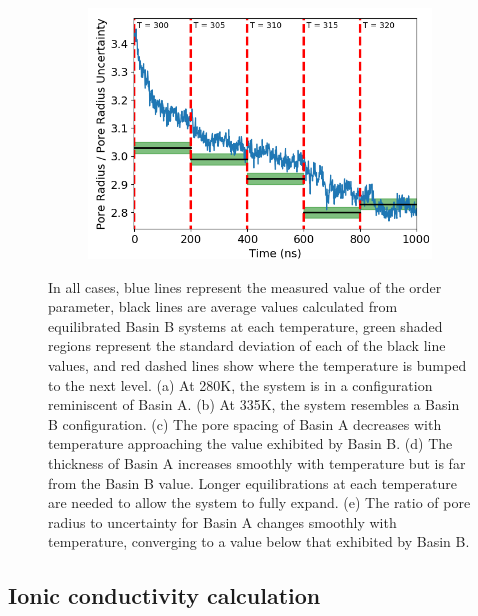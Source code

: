 \documentclass{article}
\begin{document}
\begin{figure}[!ht]
\begin{subfigure}[b]{0.325\textwidth}
                \caption{}\label{fig:thickness_step}
        \end{subfigure}
        \begin{subfigure}[b]{0.325\textwidth}
                \centering
                \includegraphics[width=\textwidth]{order_layered.png}
                \caption{}\label{fig:order_step}
        \end{subfigure}
	\caption{In all cases, blue lines represent the measured value of
	the order parameter, black lines are average values calculated from
	equilibrated Basin B systems at each temperature, green shaded regions
	represent the standard deviation of each of the black line values, and 
	red dashed lines show where the temperature is bumped to the next level.
	(a) At 280K, the system is in a configuration reminiscent of
	Basin A. (b) At 335K, the system resembles a Basin B configuration. (c) The pore
	spacing of Basin A decreases with temperature approaching the value 
	exhibited by Basin B. (d) The thickness of Basin A increases smoothly with 
	temperature but is far from the Basin B value. Longer equilibrations at 
	each temperature are needed to allow the system to fully expand. (e) The ratio 
	of pore radius to uncertainty for Basin A changes smoothly with temperature,
	converging to a value below that exhibited by Basin B.}\label{fig:phase_transition}
  \end{figure}

  \subsection*{Ionic conductivity calculation}
\end{document}
